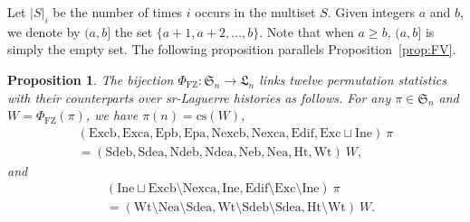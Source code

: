 \documentclass[12pt]{amsart}
\numberwithin{equation}{section}
\theoremstyle{plain}
\newtheorem{proposition}[theorem]{Proposition}
\theoremstyle{definition}
\def\FZ{\mathrm{FZ}}
\def\SS{\mathfrak{S}}
\def\LH{\mathfrak{L}}
\def\cs{\mathrm{cs}}
\def\Neb{\mathrm{Neb}}
\def\Nea{\mathrm{Nea}}
\def\Sdeb{\mathrm{Sdeb}}
\def\Sdea{\mathrm{Sdea}}
\def\Ndeb{\mathrm{Ndeb}}
\def\Ndea{\mathrm{Ndea}}
\def\Het{\mathrm{Ht}}
\def\Wt{\mathrm{Wt}}
\def\Edif{\mathrm{Edif}}
\def\Exc{\mathrm{Exc}}
\def\Excpb{\mathrm{Epb}}
\def\Excpa{\mathrm{Epa}}
\def\Nexcb{\mathrm{Nexcb}}
\def\Nexca{\mathrm{Nexca}}
\def\Excb{\mathrm{Excb}}
\def\Exca{\mathrm{Exca}}
\def\Ine{\mathrm{Ine}}
\begin{document}
Let $|S|_i$ be the number of times $i$ occurs in the multiset $S$. Given integers $a$ and $b$, we denote by $(a,b]$ the set $\{a+1,a+2,\ldots,b\}$. Note that when $a\ge b$, $(a,b]$ is simply the empty set. The following proposition parallels Proposition~\ref{prop:FV}.

\begin{proposition}\label{prop:FZ}
The bijection $\Phi_{\FZ}:\SS_n\rightarrow \LH_n$ links twelve permutation statistics with their counterparts over sr-Laguerre histories as follows. For any $\pi\in\SS_n$ and $W=\Phi_{\FZ}(\pi)$, we have $\pi(n)=\cs(W)$,
\begin{align}
\label{eq:FZSET}
(\Excb,\Exca,\Excpb,\Excpa,\Nexcb,\Nexca,\Edif,\Exc\sqcup\Ine)\:\pi \\[3pt]
= (\Sdeb,\Sdea,\Ndeb,\Ndea,\Neb,\Nea, \Het,\Wt)\:W,  \nonumber
\end{align}
and
\begin{align}
\label{eq:FZSET2}
&(\Ine \sqcup \Excb \setminus \Nexca, \Ine, \Edif \setminus \Exc \setminus \Ine)\:\pi \\
&= ( \Wt\setminus\Nea\setminus\Sdea,
\Wt\setminus\Sdeb\setminus\Sdea,\Het\setminus\Wt)\:W. \nonumber
\end{align}
\end{proposition}
\end{document}
